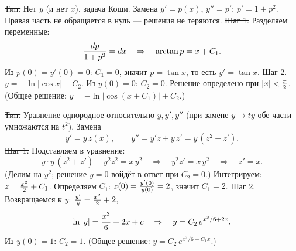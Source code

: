\st{Тип.} Нет $y$ (и нет $x$), задача Коши. Замена $y'=p(x)$, $y''=p'$:
$p'=1+p^2$. Правая часть не обращается в нуль --- решения не теряются.
\st{Шаг 1.} Разделяем переменные:
$${dp\over1+p^2}=dx\quad\Rightarrow\quad\arctan p=x+C_1.$$
Из $p(0)=y'(0)=0$: $C_1=0$, значит $p=\tan x$, то есть $y'=\tan x$.
\st{Шаг 2.} $y=-\ln|\cos x|+C_2$. Из $y(0)=0$: $C_2=0$. Решение определено при
$|x|<{\pi\over2}$.
\smallskip
(Общее решение: $y=-\ln|\cos(x+C_1)|+C_2$.)

\st{Тип.} Уравнение однородное относительно $y,y',y''$ (при замене
$y\to ty$ обе части умножаются на $t^2$). Замена
$$y'=y\,z(x),\qquad y''=y'z+y\,z'=y\,(z^2+z').$$
\st{Шаг 1.} Подставляем в уравнение:
$$y\cdot y\,(z^2+z')-y^2z^2=x\,y^2\quad\Rightarrow\quad y^2z'=x\,y^2
\quad\Rightarrow\quad z'=x.$$
(Делим на $y^2$; решение $y=0$ войдёт в ответ при $C_2=0$.)
Интегрируем: $z={x^2\over2}+C_1$. Определяем $C_1$: $z(0)={y'(0)\over y(0)}=2$,
значит $C_1=2$.
\st{Шаг 2.} Возвращаемся к $y$: ${y'\over y}={x^2\over2}+2$,
$$\ln|y|={x^3\over6}+2x+c\quad\Rightarrow\quad y=C_2\,e^{x^3/6+2x}.$$
Из $y(0)=1$: $C_2=1$.
\smallskip
(Общее решение: $y=C_2\,e^{x^3/6+C_1x}$.)

\bye
